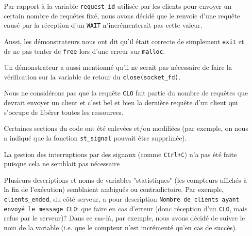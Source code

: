 \documentclass[11pt]{article}
\begin{document}
Par rapport à la variable \texttt{request\_id} utilisée par les clients pour envoyer un certain nombre de requêtes fixé, nous avons décidé que le renvoie d'une requête causé par la réception d'un \texttt{WAIT} n'incrémenterait pas cette valeur.

Aussi, les démonstrateurs nous ont dit qu'il était correcte de simplement \texttt{exit} et de ne pas tenter de \texttt{free} lors d'une erreur sur \texttt{malloc}.

Un démonstrateur a aussi mentionné qu'il ne serait pas nécessaire de faire la vérification sur la variable de retour du \texttt{close(socket\_fd)}.

Nous ne considérons pas que la requête \texttt{CLO} fait partie du nombre de requêtes que devrait envoyer un client et c'est bel et bien la dernière requête d'un client qui s'occupe de libérer toutes les ressources.

Certaines sections du code ont été enlevées et/ou modifiées (par exemple, on nous a indiqué que la fonction \texttt{st\_signal} pouvait être supprimée).

La gestion des interruptions par des signaux (comme \texttt{Ctrl+C}) n'a pas été faite puisque cela ne semblait pas nécessaire

Plusieurs descriptions et noms de variables "statistiques" (les compteurs affichés à la fin de l'exécution) semblaient ambiguës ou contradictoire. Par exemple, \texttt{clients\_ended}, du côté serveur, a pour description \texttt{Nombre de clients ayant envoyé le message CLO}: que faire en cas d'erreur (donc réception d'un \texttt{CLO}, mais refus par le serveur)? Dans ce cas-là, par exemple, nous avons décidé de suivre le nom de la variable (i.e. que le compteur n'est incrémenté qu'en cas de succès).
\end{document}
